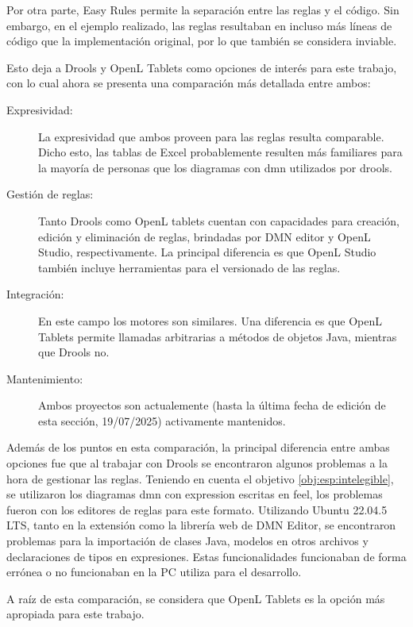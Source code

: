 Por otra parte, Easy Rules permite la separación entre las reglas y el código. Sin embargo, en el ejemplo realizado, las reglas resultaban en incluso más líneas de código que la implementación original, por lo que también se considera inviable.

Esto deja a Drools y OpenL Tablets como opciones de interés para este trabajo, con lo cual ahora se presenta una comparación más detallada entre ambos:

\begin{description}
    \item[Expresividad:] La expresividad que ambos proveen para las reglas resulta comparable. Dicho esto, las tablas de Excel probablemente resulten más familiares para la mayoría de personas que los diagramas con \acrfull{dmn} utilizados por drools.
    \item[Gestión de reglas:] Tanto Drools como OpenL tablets cuentan con capacidades para creación, edición y eliminación de reglas, brindadas por DMN editor y OpenL Studio, respectivamente. La principal diferencia es que OpenL Studio también incluye herramientas para el versionado de las reglas.
    \item[Integración:] En este campo los motores son similares. Una diferencia es que OpenL Tablets permite llamadas arbitrarias a métodos de objetos Java, mientras que Drools no.
    \item[Mantenimiento:] Ambos proyectos son actualemente (hasta la última fecha de edición de esta sección, 19/07/2025) activamente mantenidos.
\end{description}

Además de los puntos en esta comparación, la principal diferencia entre ambas opciones fue que al trabajar con Drools se encontraron algunos problemas a la hora de gestionar las reglas. Teniendo en cuenta el objetivo \ref{obj:esp:intelegible}, se utilizaron los diagramas \acrshort{dmn} con expression escritas en \acrfull{feel}, los problemas fueron con los editores de reglas para este formato.
Utilizando Ubuntu 22.04.5 LTS, tanto en la extensión como la librería web de DMN Editor, se encontraron problemas para la importación de clases Java, modelos en otros archivos y declaraciones de tipos en expresiones. Estas funcionalidades funcionaban de forma errónea o no funcionaban en la PC utiliza para el desarrollo.

A raíz de esta comparación, se considera que OpenL Tablets es la opción más apropiada para este trabajo.
